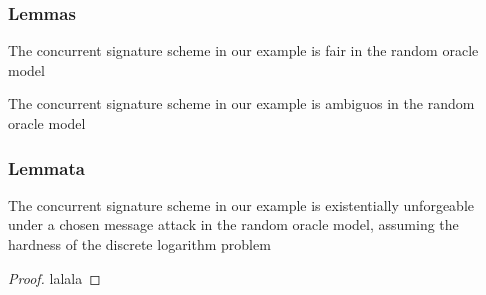\begin{frame}
	\frametitle{Lemmas}

	\begin{lemma}[Fairness]
		The concurrent signature scheme in our example is fair in the random oracle model
	\end{lemma}

	\begin{lemma}[Ambiguity]
		The concurrent signature scheme in our example is ambiguos in the random oracle model
	\end{lemma}	
\end{frame}

\begin{frame}
	\frametitle{Lemmata}

	\begin{lemma}[Unforgeability]
		The concurrent signature scheme in our example is existentially unforgeable under a chosen message attack in the random oracle model, assuming the hardness of the discrete logarithm problem
	\end{lemma}	
	\begin{proof}
		lalala
	\end{proof}
\end{frame}